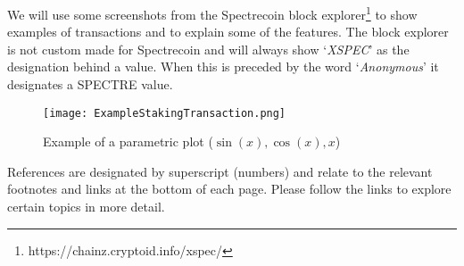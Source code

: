 We will use some screenshots from the Spectrecoin block
explorer\footnote{https://chainz.cryptoid.info/xspec/} to show examples of
transactions and to explain some of the features. The block explorer
is not custom made for Spectrecoin and will always show ‘\textit{XSPEC}’
as the designation behind a value. When this is preceded by the word
‘\textit{Anonymous}’ it designates a SPECTRE value.

\begin{figure}[h]
	\caption{Example of a parametric plot ($\sin (x), \cos(x), x$)}
	\centering
	\texttt{[image: ExampleStakingTransaction.png]}
\end{figure}


References are designated by superscript (numbers) and relate to the relevant
footnotes and links at the bottom of each page. Please follow the links to
explore certain topics in more detail.
